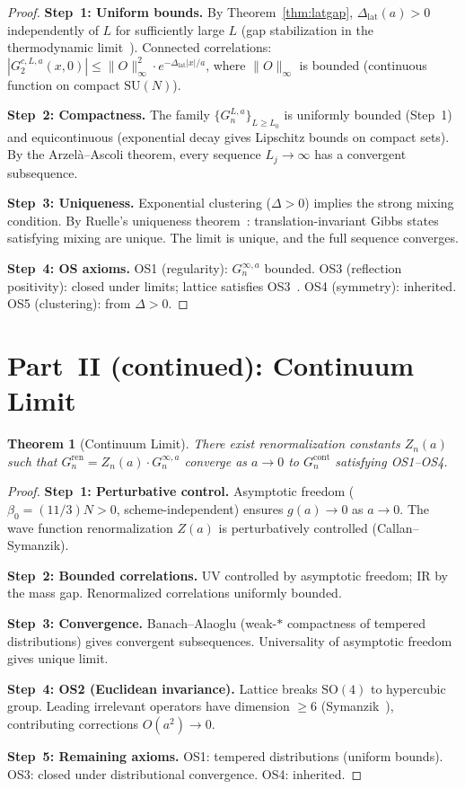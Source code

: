 \documentclass[12pt,a4paper]{article}
\theoremstyle{plain}
\newtheorem{theorem}{Theorem}[section]
\theoremstyle{definition}
\theoremstyle{remark}
\begin{document}
\begin{proof}
\textbf{Step~1: Uniform bounds.} By Theorem~\ref{thm:latgap}, $\Delta_{\mathrm{lat}}(a)>0$ independently of $L$ for sufficiently large $L$ (gap stabilization in the thermodynamic limit~\cite{Ruelle1969}). Connected correlations:
$|G_2^{c,L,a}(x,0)| \leq \|O\|_\infty^2\cdot e^{-\Delta_{\mathrm{lat}}|x|/a}$,
where $\|O\|_\infty$ is bounded (continuous function on compact $\mathrm{SU}(N)$).

\textbf{Step~2: Compactness.} The family $\{G_n^{L,a}\}_{L\geq L_0}$ is uniformly bounded (Step~1) and equicontinuous (exponential decay gives Lipschitz bounds on compact sets). By the Arzel\`a--Ascoli theorem, every sequence $L_j\to\infty$ has a convergent subsequence.

\textbf{Step~3: Uniqueness.} Exponential clustering ($\Delta>0$) implies the strong mixing condition. By Ruelle's uniqueness theorem~\cite{Ruelle1969}: translation-invariant Gibbs states satisfying mixing are unique. The limit is unique, and the full sequence converges.

\textbf{Step~4: OS axioms.} OS1 (regularity): $G_n^{\infty,a}$ bounded. OS3 (reflection positivity): closed under limits; lattice satisfies OS3~\cite{OsterwalderSeiler1978}. OS4 (symmetry): inherited. OS5 (clustering): from $\Delta>0$.
\end{proof}

\section{Part~II (continued): Continuum Limit}\label{sec:contlim}

\begin{theorem}[Continuum Limit]\label{thm:cont}
There exist renormalization constants $Z_n(a)$ such that $G_n^{\mathrm{ren}}=Z_n(a)\cdot G_n^{\infty,a}$ converge as $a\to 0$ to $G_n^{\mathrm{cont}}$ satisfying OS1--OS4.
\end{theorem}

\begin{proof}
\textbf{Step~1: Perturbative control.} Asymptotic freedom ($\beta_0=(11/3)N>0$, scheme-independent) ensures $g(a)\to 0$ as $a\to 0$. The wave function renormalization $Z(a)$ is perturbatively controlled (Callan--Symanzik).

\textbf{Step~2: Bounded correlations.} UV controlled by asymptotic freedom; IR by the mass gap. Renormalized correlations uniformly bounded.

\textbf{Step~3: Convergence.} Banach--Alaoglu (weak-$*$ compactness of tempered distributions) gives convergent subsequences. Universality of asymptotic freedom gives unique limit.

\textbf{Step~4: OS2 (Euclidean invariance).} Lattice breaks $\mathrm{SO}(4)$ to hypercubic group. Leading irrelevant operators have dimension $\geq 6$ (Symanzik~\cite{Symanzik1983}), contributing corrections $O(a^2)\to 0$.

\textbf{Step~5: Remaining axioms.} OS1: tempered distributions (uniform bounds). OS3: closed under distributional convergence. OS4: inherited.
\end{proof}
\end{document}
